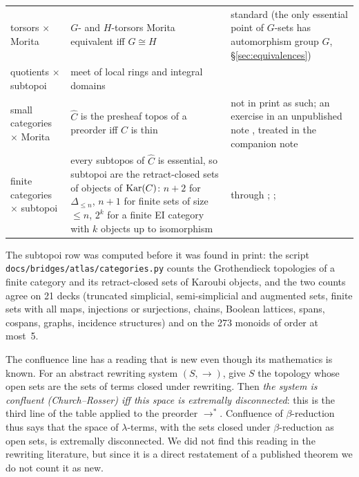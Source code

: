 \begin{center}
\begin{tabularx}{\linewidth}{>{\raggedright\arraybackslash}p{4.3cm}>{\raggedright\arraybackslash}X>{\raggedright\arraybackslash}p{3.3cm}}
torsors $\times$ Morita & $G$- and $H$-torsors Morita equivalent iff $G\cong H$ & standard (the only essential point of $G$-sets has automorphism group $G$, \S\ref{sec:equivalences})\\
quotients $\times$ subtopoi & meet of local rings and integral domains & \cite[\S18]{caramello-lattices}\\
small categories $\times$ Morita & $\widehat C$ is the presheaf topos of a preorder iff $C$ is thin & not in print as such; an exercise in an unpublished note \cite[p.~26]{grothendieck-161-3}, treated in the companion note \cite{bridges-notes}\\
finite categories $\times$ subtopoi & every subtopos of $\widehat C$ is essential, so subtopoi are the retract-closed sets of objects of $\operatorname{Kar}(C)$: $n+2$ for $\Delta_{\le n}$, $n+1$ for finite sets of size $\le n$, $2^{k}$ for a finite EI category with $k$ objects up to isomorphism & \cite[IV, Ex.~9.1.12]{sga4} through \cite[Prop.~4.1]{wu-xu}; \cite{kelly-lawvere}; \cite[Cor.~3.3, Ex.~6.3--6.4]{menni}\\
\bottomrule
\end{tabularx}
\end{center}

The subtopoi row was computed before it was found in print: the script \nolinkurl{docs/bridges/atlas/categories.py} counts the Grothendieck topologies of a finite category and its retract-closed sets of Karoubi objects, and the two counts agree on 21 decks (truncated simplicial, semi-simplicial and augmented sets, finite sets with all maps, injections or surjections, chains, Boolean lattices, spans, cospans, graphs, incidence structures) and on the 273 monoids of order at most~5.

The confluence line has a reading that is new even though its mathematics is known. For an abstract rewriting system $(S,\to)$, give $S$ the topology whose open sets are the sets of terms closed under rewriting. Then \emph{the system is confluent (Church--Rosser) iff this space is extremally disconnected}: this is the third line of the table applied to the preorder $\to^*$. Confluence of $\beta$-reduction thus says that the space of $\lambda$-terms, with the sets closed under $\beta$-reduction as open sets, is extremally disconnected. We did not find this reading in the rewriting literature, but since it is a direct restatement of a published theorem we do not count it as new.
